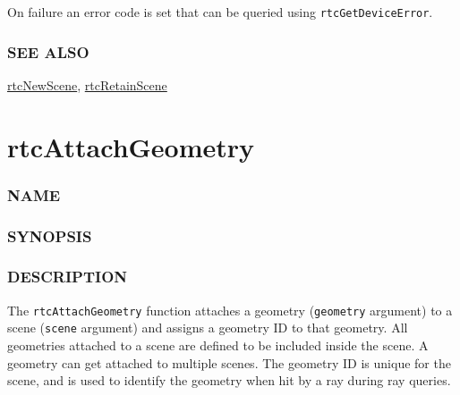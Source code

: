 On failure an error code is set that can be queried using
\texttt{rtcGetDeviceError}.

\subsubsection{SEE ALSO}\label{see-also}

\hyperref[rtcnewscene]{rtcNewScene},
\hyperref[rtcretainscene]{rtcRetainScene}

\pagebreak

\section{rtcAttachGeometry}\label{rtcattachgeometry}

\subsubsection{NAME}\label{name}

\begin{Shaded}
\begin{Highlighting}[]
\OperatorTok{{-}}
\end{Highlighting}
\end{Shaded}

\subsubsection{SYNOPSIS}\label{synopsis}

\begin{Shaded}
\begin{Highlighting}[]

 \OperatorTok{(}
\OperatorTok{,}
\OperatorTok{);}
\end{Highlighting}
\end{Shaded}

\subsubsection{DESCRIPTION}\label{description}

The \texttt{rtcAttachGeometry} function attaches a geometry
(\texttt{geometry} argument) to a scene (\texttt{scene} argument) and
assigns a geometry ID to that geometry. All geometries attached to a
scene are defined to be included inside the scene. A geometry can get
attached to multiple scenes. The geometry ID is unique for the scene,
and is used to identify the geometry when hit by a ray during ray
queries.

